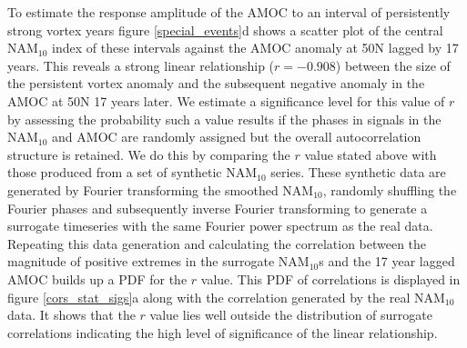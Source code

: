 To estimate the response amplitude of the AMOC to an interval of persistently strong vortex years figure \ref{special_events}d shows a scatter plot of the central NAM$_{10}$ index of these intervals against the AMOC anomaly at 50N lagged  by 17 years. This reveals a strong linear relationship ($r = -0.908$) between the size of the persistent vortex anomaly and the subsequent negative anomaly in the AMOC at 50N 17 years later. We estimate a significance level for this value of $r$ by assessing the probability such a value results if the phases in signals in the NAM$_{10}$ and AMOC are randomly assigned but the overall autocorrelation structure is retained. We do this by comparing the $r$ value stated above with those produced from a set of synthetic NAM$_{10}$ series. These synthetic data are generated by Fourier transforming the smoothed NAM$_{10}$, randomly shuffling the Fourier phases and subsequently inverse Fourier transforming to generate a surrogate timeseries with the same Fourier power spectrum as the real data. Repeating this data generation and calculating the correlation between the magnitude of positive extremes in the surrogate NAM$_{10}$s and the 17 year lagged AMOC builds up a PDF for the $r$ value. This PDF of correlations is displayed in figure \ref{cors_stat_sigs}a along with the correlation generated by the real NAM$_{10}$ data. It shows that the $r$ value lies well outside the distribution of surrogate correlations indicating the high level of significance of the linear relationship.

